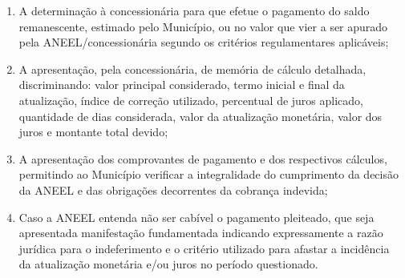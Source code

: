 \begin{enumerate}[resume]
\begin{enumerate}
        \item A determinação à concessionária para que efetue o pagamento do saldo remanescente, estimado pelo Município, ou no valor que vier a ser apurado pela ANEEL/concessionária segundo os critérios regulamentares aplicáveis;

        \item A apresentação, pela concessionária, de memória de cálculo detalhada, discriminando: valor principal considerado, termo inicial e final da atualização, índice de correção utilizado, percentual de juros aplicado, quantidade de dias considerada, valor da atualização monetária, valor dos juros e montante total devido;

        \item A apresentação dos comprovantes de pagamento e dos respectivos cálculos, permitindo ao Município verificar a integralidade do cumprimento da decisão da ANEEL e das obrigações decorrentes da cobrança indevida;

        \item Caso a ANEEL entenda não ser cabível o pagamento pleiteado, que seja apresentada manifestação fundamentada indicando expressamente a razão jurídica para o indeferimento e o critério utilizado para afastar a incidência da atualização monetária e/ou juros no período questionado.
    \end{enumerate}
\end{enumerate}